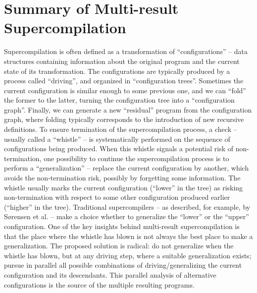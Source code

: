 \documentclass[submission,copyright,creativecommons]{eptcs}
\begin{document}
\section{Summary of Multi-result Supercompilation}\label{sec:MRSCSummary}

Supercompilation is often defined as a transformation of ``configurations'' --
data structures containing information about the original program and the
current state of its transformation.
The configurations are typically produced by a process called ``driving'',
and organized in ``configuration trees''.
Sometimes the current configuration is similar enough to some previous one,
and we can ``fold'' the former to the latter,
turning the configuration tree into a ``configuration graph''.
Finally, we can generate a new ``residual'' program from the configuration
graph, where folding typically corresponds to the introduction of new
recursive definitions.
To ensure termination of the supercompilation process, a check -- usually called 
a ``whistle'' -- is systematically performed on the sequence of configurations
being produced.
When this whistle signals a potential risk of non-termination, one possibility
to continue the supercompilation process is to perform a ``generalization'' --
replace the current configuration by another, which avoids the non-termination
risk, possibly by forgetting some information.
The whistle usually marks the current configuration (``lower'' in the tree) as risking
non-termination with respect to some other configuration produced earlier (``higher'' in the tree).
Traditional supercompilers -- as described, for example, by S{\o}rensen et al. \cite{sorm98b} --
make a choice whether to generalize the ``lower'' or the ``upper'' configuration.
One of the key insights behind multi-result supercompilation is that the place
where the whistle has blown is not always the best place to make a generalization.
The proposed solution is radical: do not generalize when the whistle has blown,
but at any driving step, where a suitable generalization exists;
pursue in parallel all possible combinations of driving/generalizing 
the current configuration and its descendants.
This parallel analysis of alternative configurations is the source
of the multiple resulting programs.
\end{document}
